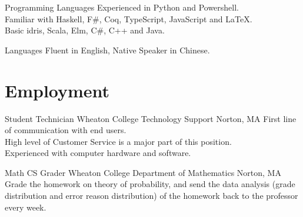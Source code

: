 \documentclass[11pt,a4paper,roman]{moderncv}        %
\begin{document}
\cventry{}
{Programming Languages}{}{}{}
{Experienced in Python and Powershell.\\
Familiar with Haskell, F\#, Coq, TypeScript, JavaScript and \LaTeX{}.\\
Basic idris, Scala, Elm, C\#, C++ and Java.}

\cventry{}
{Languages}{}{}{}
{Fluent in English, Native Speaker in Chinese.}



\section{Employment}
{Student Technician}
{Wheaton College Technology Support}
{Norton, MA}{}
{First line of communication with end users.\\
High level of Customer Service is a major part of this position.\\
Experienced with computer hardware and software.}

{Math CS Grader}
{Wheaton College Department of Mathematics}
{Norton, MA}{}
{Grade the homework on theory of probability,
and send the data analysis (grade distribution and error reason distribution)
of the homework back to the professor every week.}
\end{document}

